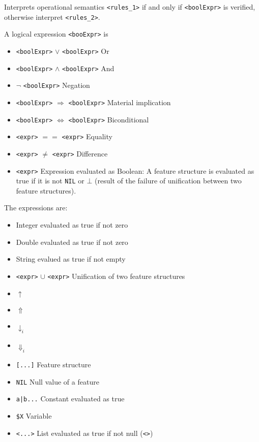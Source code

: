 \documentclass[11pt]{article}
\begin{document}
\begin{itemize}
\begin{itemize}
      Interprets operational semantics \verb#<rules_1># if and
      only if \verb#<boolExpr># is verified, otherwise interpret \verb#<rules_2>#.
      
    \end{itemize}

    A logical expression \verb#<booExpr># is

    \begin{itemize}
    \item \verb#<boolExpr>#  $\lor$ \verb#<boolExpr># Or
    \item \verb#<boolExpr>#  $\land$ \verb#<boolExpr># And
    \item $\neg$ \verb#<boolExpr># Negation
    \item \verb#<boolExpr>#  $\Rightarrow$ \verb#<boolExpr>#
      Material implication
    \item \verb#<boolExpr>#  $\Leftrightarrow$ \verb#<boolExpr>#
      Biconditional
    \item \verb#<expr>#  $==$ \verb#<expr># Equality
    \item \verb#<expr>#  $\neq$ \verb#<expr># Difference
    \item \verb#<expr># Expression evaluated as Boolean: A
      feature structure is evaluated as true if it is not
      \verb#NIL# or $\bot$ (result of the failure of unification
      between two feature structures).
    \end{itemize}
    
    The expressions are:
    
    \begin{itemize}
    \item Integer evaluated as true if not zero
    \item Double evaluated as true if not zero
    \item String evalued as true if not empty
    \item \verb#<expr>#  $\cup$ \verb#<expr># Unification of two
      feature structures
    \item $\uparrow$
    \item $\Uparrow$
    \item $\downarrow_i$
    \item $\Downarrow_i$
    \item \verb#[...]# Feature structure
    \item \verb#NIL# Null value of a feature
    \item \verb#a|b...# Constant evaluated as true
    \item \verb#$X# Variable
    \item \verb#<...># List evaluated as true if not null (\verb#<>#)
    \end{itemize}
    

\end{itemize}
\end{document}

